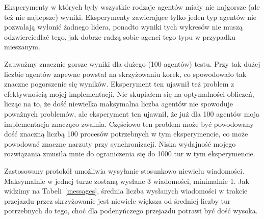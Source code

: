 \documentclass[11pt]{article}
\begin{document}
Eksperymenty w których były wszystkie rodzaje agentów miały nie najgorsze (ale też nie najlepsze) wyniki. Eksperymenty zawierające tylko jeden typ agentów nie pozwalają wyłonić żadnego lidera, ponadto wyniki tych wykresów nie muszą odzwierciedlać tego, jak dobrze radzą sobie agenci tego typu w przypadku mieszanym.

Zauważmy znacznie gorsze wyniki dla dużego (100 agentów) testu. Przy tak dużej liczbie agentów zapewne powstał na skrzyżowaniu korek, co spowodowało tak znaczne pogorszenie się wyników. Eksperyment ten ujawnił też problem z efektywnością mojej implementacji. Nie skupiałem się na optymalności obliczeń, licząc na to, że dość niewielka maksymalna liczba agentów nie spowoduje poważnych problemów, ale eksperyment ten ujawnił, że już dla 100 agentów moja implementacja znacząco zwalnia. Częściowo ten problem może być powodowany dość znaczną liczbą 100 procesów potrzebnych w tym eksperymencie, co może powodować znaczne narzuty przy synchronizacji. Niska wydajność mojego rozwiązania zmusiła mnie do ograniczenia się do 1000 tur w tym eksperymencie.

Zastosowany protokół umożliwia wysyłanie stosunkowo niewielu wiadomości. Maksymalnie w jednej turze zostaną wysłane 3 wiadomości, minimalnie 1. Jak widzimy na Tabeli~\ref{messages}, średnia liczba wysłanych wiadomości w trakcie przejazdu przez skrzyżowanie jest niewiele większa od średniej liczby tur potrzebnych do tego, choć dla podenyńczego przejazdu potrawi być dość wysoka.
\end{document}
